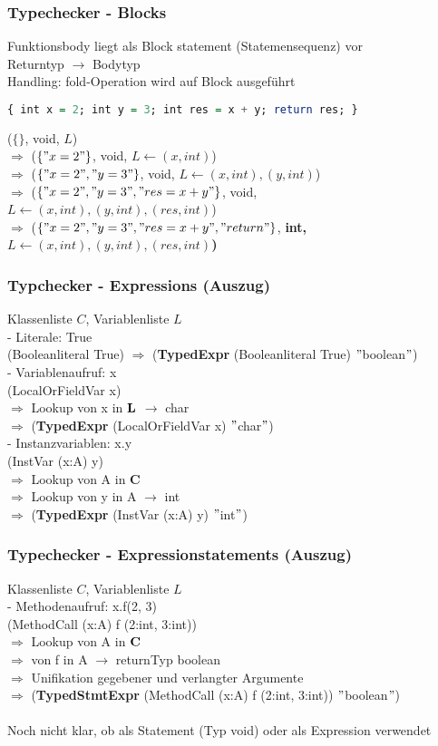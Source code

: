 \begin{frame}[fragile]
    \frametitle{Typechecker - Blocks}
Funktionsbody liegt als Block statement (Statemensequenz) vor \\
Returntyp $\rightarrow$ Bodytyp \\
Handling: fold-Operation wird auf Block ausgeführt
\begin{lstlisting}[language=Haskell]
{ int x = 2; int y = 3; int res = x + y; return res; }	
\end{lstlisting}
($\{ \}$, void, $L$) \\
$\Rightarrow$ ($\{"x=2"\}$, void, $L \leftarrow (x,int)$) \\
$\Rightarrow$ ($\{"x=2","y=3"\}$, void, $L \leftarrow (x,int),(y,int)$) \\
$\Rightarrow$ ($\{"x=2","y=3","res=x+y"\}$, void, $L \leftarrow (x,int),(y,int),(res,int)$) \\
$\Rightarrow$ ($\{"x=2","y=3","res=x+y","return"\}$, \bf{int}, $L \leftarrow (x,int),(y,int),(res,int)$) \\
\end{frame}

\begin{frame}
    \frametitle{Typchecker - Expressions (Auszug)}
Klassenliste $C$, Variablenliste $L$ \\
- Literale: True\\
(Booleanliteral True) $\Rightarrow$ ({\bf TypedExpr} (Booleanliteral True) $"$boolean$"$) \\
- Variablenaufruf: x \\
(LocalOrFieldVar x) \\
$\Rightarrow$ Lookup von x in ${\bf L}$ $\rightarrow$ char \\
$\Rightarrow$ ({\bf TypedExpr} (LocalOrFieldVar x) $"$char$"$) \\ 
- Instanzvariablen: x.y \\
(InstVar (x:A) y) \\
$\Rightarrow$ Lookup von A in {\bf C} \\ 
$\Rightarrow$ Lookup von y in A $\rightarrow$ int \\
$\Rightarrow$  ({\bf TypedExpr} (InstVar (x:A) y) $"$int$"$)
 
\end{frame}

\begin{frame}
    \frametitle{Typechecker - Expressionstatements (Auszug)}
Klassenliste $C$, Variablenliste $L$ \\
- Methodenaufruf: x.f(2, 3) \\
(MethodCall (x:A) f (2:int, 3:int)) \\
$\Rightarrow$ Lookup von A in ${\bf C}$ \\
$\Rightarrow$ von f in A $\rightarrow$ returnTyp boolean\\
$\Rightarrow$ Unifikation gegebener und verlangter Argumente \\
$\Rightarrow$ ({\bf TypedStmtExpr} (MethodCall (x:A) f (2:int, 3:int)) $"$boolean$"$) \\
\ \\
Noch nicht klar, ob als Statement (Typ void) oder als Expression verwendet
\end{frame}

